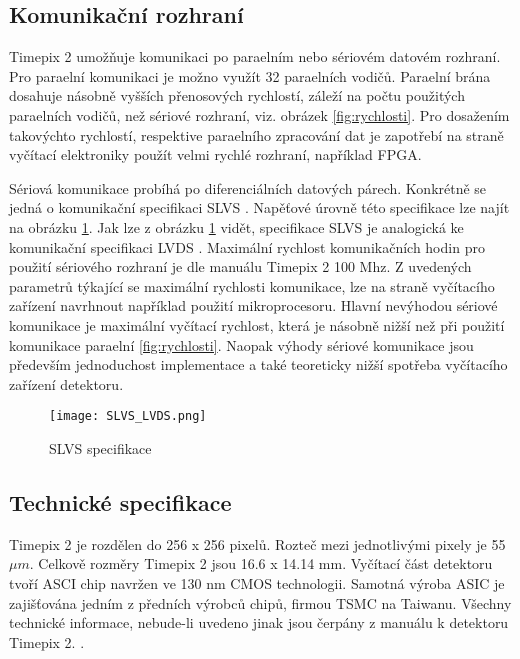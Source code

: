 \subsection{Komunikační rozhraní}
\label{Komunikacni rozhrani}
Timepix 2 umožňuje komunikaci po paraelním nebo sériovém datovém rozhraní. Pro paraelní komunikaci je možno využít 32 paraelních vodičů. Paraelní brána dosahuje násobně vyšších přenosových rychlostí, záleží na počtu použitých paraelních vodičů, než sériové rozhraní, viz. obrázek \ref{fig:rychlosti}. Pro dosažením takovýchto rychlostí, respektive paraelního zpracování dat je zapotřebí na straně vyčítací elektroniky použít velmi rychlé rozhraní, například FPGA.  
\par Sériová komunikace probíhá po diferenciálních datových párech. Konkrétně se jedná o komunikační specifikaci SLVS \cite{SLVS}. Napěťové úrovně této specifikace lze najít na obrázku \ref{fig:SLVS_LVDS}. Jak lze z obrázku \ref{fig:SLVS_LVDS} vidět, specifikace SLVS je analogická ke komunikační specifikaci LVDS \cite{LVDS}. Maximální rychlost komunikačních hodin pro použití sériového rozhraní je dle manuálu Timepix 2 \cite{tpx2_manual} 100 Mhz. Z uvedených parametrů týkající se maximální rychlosti komunikace, lze na straně vyčítacího zařízení navrhnout například použití mikroprocesoru. Hlavní nevýhodou sériové komunikace je maximální vyčítací rychlost, která je násobně nižší než při použití komunikace paraelní \ref{fig:rychlosti}. Naopak výhody sériové komunikace jsou především jednoduchost implementace a také teoreticky nižší spotřeba vyčítacího zařízení detektoru.
\begin{figure}[h!]
	\centering
	\captionsetup{justification=centering}
	\texttt{[image: SLVS\_LVDS.png]}
	\caption{SLVS specifikace \cite{SLVS}} 
	\label{fig:SLVS_LVDS}
\end{figure}	

\subsection{Technické specifikace} %
\label{Technicka specifikace}
Timepix 2 je rozdělen do 256 x 256 pixelů. Rozteč mezi jednotlivými pixely je 55 $\mu$$m$. Celkově rozměry Timepix 2 jsou 16.6 x 14.14 mm. Vyčítací část detektoru tvoří ASCI chip navržen ve 130 nm CMOS technologii. Samotná výroba ASIC je zajišťována jedním z předních výrobců chipů, firmou TSMC \cite{TSMC} na Taiwanu. Všechny technické informace, nebude-li uvedeno jinak jsou čerpány z manuálu k detektoru Timepix 2. \cite{tpx2_manual}.

